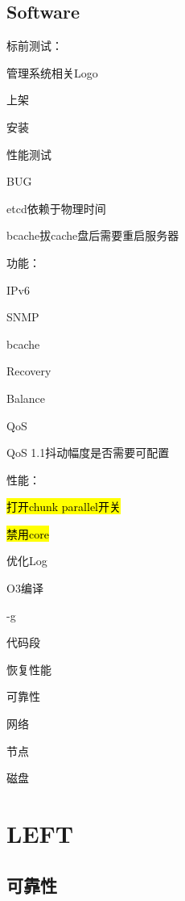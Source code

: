 \subsection{Software}

标前测试：
\begin{enumbox}
\item 管理系统相关Logo
\item 上架
\item 安装
\item 性能测试
\end{enumbox}

BUG
\begin{enumbox}
\item etcd依赖于物理时间
\item bcache拔cache盘后需要重启服务器
\end{enumbox}

功能：
\begin{enumbox}
\item IPv6
\item SNMP
\item bcache
\item Recovery
\item Balance
\item QoS
\item QoS 1.1抖动幅度是否需要可配置
\end{enumbox}

性能：
\begin{enumbox}
\item \hl{打开chunk parallel开关}
\item \hl{禁用core}
\item 优化Log
\item O3编译
\item -g
\item 代码段
\item 恢复性能
\end{enumbox}

可靠性
\begin{enumbox}
\item 网络
\item 节点
\item 磁盘
\end{enumbox}

\section{LEFT}

\subsection{可靠性}

